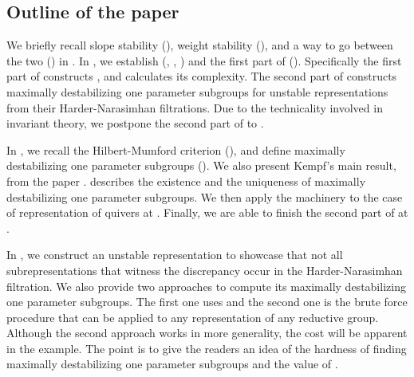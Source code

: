 \documentclass[a4paper]{amsart}
\numberwithin{equation}{section}
\theoremstyle{plain}
\theoremstyle{definition}
\begin{document}
\subsection{Outline of the paper}
We briefly recall slope stability (), weight stability (), and a way to go between the two () in . In , we establish  (, , ) and the first part of  (). Specifically the first part of  constructs , and calculates its complexity. The second part of  constructs maximally destabilizing one parameter subgroups for unstable representations from their Harder-Narasimhan filtrations. Due to the technicality involved in invariant theory, we postpone the second part of  to . 

In , we recall the Hilbert-Mumford criterion (), and define maximally destabilizing one parameter subgroups (). We also present Kempf's main result,  from the paper \cite{MR506989}.  describes the existence and the uniqueness of maximally destabilizing one parameter subgroups. We then apply the machinery to the case of representation of quivers at . Finally, we are able to finish the second part of  at .

In , we construct an unstable representation to showcase that not all subrepresentations that witness the discrepancy occur in the Harder-Narasimhan filtration. We also provide two approaches to compute its maximally destabilizing one parameter subgroups. The first one uses  and the second one is the brute force procedure that can be applied to any representation of any reductive group. Although the second approach works in more generality, the cost will be apparent in the example. The point is to give the readers an idea of the hardness of finding maximally destabilizing one parameter subgroups and the value of .
\end{document}
